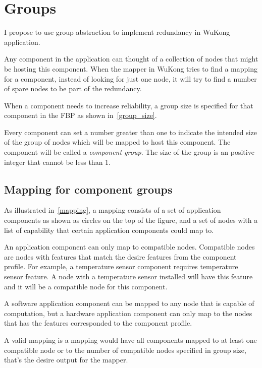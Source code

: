 \section{Groups}

I propose to use group abstraction to implement redundancy in WuKong
application.

Any component in the application can thought of a collection of nodes that might be
hosting this component. When the mapper in WuKong tries to find a mapping for
a component, instead of looking for just one node, it will try to find a number
of spare nodes to be part of the redundancy.

When a component needs to increase reliability, a group size is
specified for that component in the FBP as shown in~\ref{group_size}.

Every component can set a number greater than one to indicate the intended size
of the group of nodes which will be mapped to host this component. The
component will be called a \textit{component group}. The size of the group is
an positive integer that cannot be less than 1.

\subsection{Mapping for component groups}

As illustrated in~\ref{mapping}, a mapping consists of a set of application
components as shown as circles on the top of the figure, and a set of nodes
with a list of capability that certain application components could map to.

An application component can only map to compatible nodes. Compatible nodes are
nodes with features that match the desire features from the component
profile. For example, a temperature sensor component requires temperature
sensor feature. A node with a temperature sensor installed will have this
feature and it will be a compatible node for this component.

A software application component can be mapped to any node that is capable of
computation, but a hardware application component can only map to the nodes
that has the features corresponded to the component profile.

A valid mapping is a mapping would have all components mapped to at least one
compatible node or to the number of compatible nodes specified in group size,
that's the desire output for the mapper.

